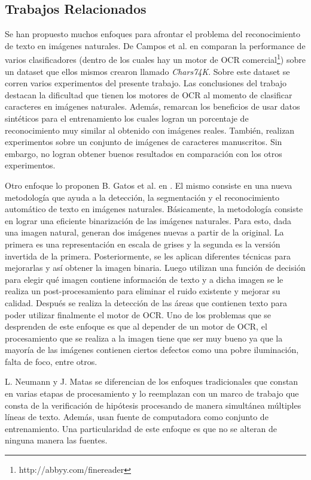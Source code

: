 \subsection{Trabajos Relacionados}
	
	Se han propuesto muchos enfoques para afrontar el problema del reconocimiento de texto en imágenes naturales. De Campos et al. en \cite{dCBV09} comparan la performance de varios clasificadores (dentro de los cuales hay un motor de OCR comercial\footnote{http://abbyy.com/finereader}) sobre un dataset que ellos mismos crearon llamado \textit{Chars74K}. Sobre este dataset se corren varios experimentos del presente trabajo. Las conclusiones del trabajo destacan la dificultad que tienen los motores de OCR al momento de clasificar caracteres en imágenes naturales. Además, remarcan los beneficios de usar datos sintéticos para el entrenamiento los cuales logran un porcentaje de reconocimiento muy similar al obtenido con imágenes reales. También, realizan experimentos sobre un conjunto de imágenes de caracteres manuscritos. Sin embargo, no logran obtener buenos resultados en comparación con los otros experimentos. 
	
	Otro enfoque lo proponen B. Gatos et al. en \cite{GPP03}. El mismo consiste en una nueva metodología que ayuda a la detección, la segmentación y el reconocimiento automático de texto en imágenes naturales. Básicamente, la metodología consiste en lograr una eficiente binarización de las imágenes naturales. Para esto, dada una imagen natural, generan dos imágenes nuevas a partir de la original. La primera es una representación en escala de grises y la segunda es la versión invertida de la primera. Posteriormente, se les aplican diferentes técnicas para mejorarlas y así obtener la imagen binaria. Luego utilizan una función de decisión para elegir qué imagen contiene información de texto y a dicha imagen se le realiza un post-procesamiento para eliminar el ruido existente y mejorar su calidad. Después se realiza la detección de las áreas que contienen texto para poder utilizar finalmente el motor de OCR. Uno de los problemas que se desprenden de este enfoque es que al depender de un motor de OCR, el procesamiento que se realiza a la imagen tiene que ser muy bueno ya que la mayoría de las imágenes contienen ciertos defectos como una pobre iluminación, falta de foco, entre otros.

	L. Neumann y J. Matas \cite{LNJM} se diferencian de los enfoques tradicionales que constan en varias etapas de procesamiento y lo reemplazan con un marco de trabajo que consta de la verificación de hipótesis procesando de manera simultánea múltiples líneas de texto. Además, usan fuente de computadora como conjunto de entrenamiento. Una particularidad de este enfoque es que no se alteran de ninguna manera las fuentes.
	